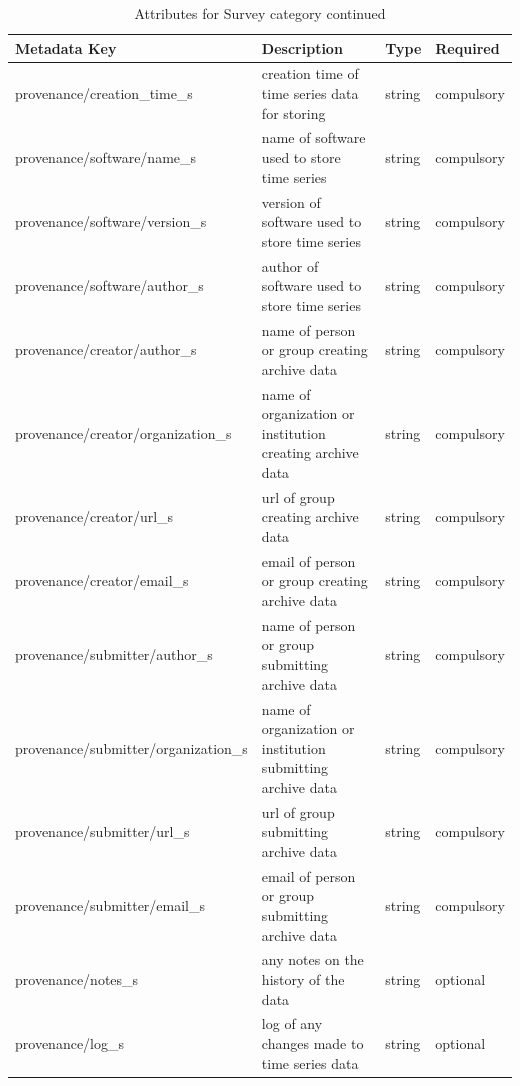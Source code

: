 \documentclass{article}
\begin{document}
\newpage
\begin{table}[htb!]
	\caption[Attributes for Survey]{Attributes for Survey category continued}
	\begin{tabular}{|l|p{3in}|l|l|}
		\hline
		\textbf{Metadata Key} & \textbf{Description} & \textbf{Type} & \textbf{Required} \\ \hline	
		provenance/creation\_time\_s & creation time of time series data for storing & string & compulsory \\ \hline
		provenance/software/name\_s & name of software used to store time series & string & compulsory \\ \hline
		provenance/software/version\_s & version of software used to store time series & string & compulsory \\ \hline
		provenance/software/author\_s & author of software used to store time series & string & compulsory \\ \hline
		provenance/creator/author\_s & name of person or group creating archive data & string & compulsory \\ \hline
		provenance/creator/organization\_s & name of organization or institution creating archive data & string & compulsory \\ \hline
		provenance/creator/url\_s & url of group creating archive data & string & compulsory \\ \hline
		provenance/creator/email\_s & email of person or group creating archive data & string & compulsory \\ \hline
		provenance/submitter/author\_s & name of person or group submitting archive data & string & compulsory \\ \hline
		provenance/submitter/organization\_s & name of organization or institution submitting archive data & string & compulsory \\ \hline
		provenance/submitter/url\_s & url of group submitting archive data & string & compulsory \\ \hline
		provenance/submitter/email\_s & email of person or group submitting archive data & string & compulsory  \\ \hline
		provenance/notes\_s & any notes on the history of the data & string & optional \\ \hline
		provenance/log\_s & log of any changes made to time series data & string & optional \\ \hline
	\end{tabular}
	\label{tab:station02}
\end{table}
   
\end{document}
